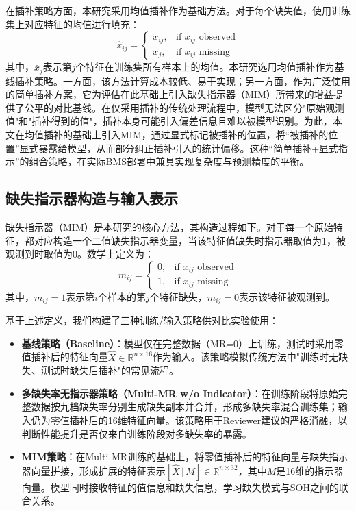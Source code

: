 \documentclass[10pt,a4paper]{ctexart}
\begin{document}
在插补策略方面，本研究采用均值插补作为基础方法。对于每个缺失值，使用训练集上对应特征的均值进行填充：
\begin{equation}
    \hat{x}_{ij} = \begin{cases}
        x_{ij}, & \text{if } x_{ij} \text{ observed} \\
        \bar{x}_j, & \text{if } x_{ij} \text{ missing}
    \end{cases}
\end{equation}
其中，$\bar{x}_j$表示第$j$个特征在训练集所有样本上的均值。本研究选用均值插补作为基线插补策略。一方面，该方法计算成本较低、易于实现；另一方面，作为广泛使用的简单插补方案，它为评估在此基础上引入缺失指示器（MIM）所带来的增益提供了公平的对比基线。在仅采用插补的传统处理流程中，模型无法区分"原始观测值"和"插补得到的值"，插补本身可能引入偏差信息且难以被模型识别。为此，本文在均值插补的基础上引入MIM，通过显式标记被插补的位置，将“被插补的位置”显式暴露给模型，从而部分纠正插补引入的统计偏移。这种“简单插补+显式指示”的组合策略，在实际BMS部署中兼具实现复杂度与预测精度的平衡。

\subsection{缺失指示器构造与输入表示}

缺失指示器（MIM）是本研究的核心方法，其构造过程如下。对于每一个原始特征，都对应构造一个二值缺失指示器变量，当该特征值缺失时指示器取值为1，被观测到时取值为0。数学上定义为：
\begin{equation}
    m_{ij} = 
    \begin{cases}
        0, & \text{if } x_{ij} \text{ observed} \\
        1, & \text{if } x_{ij} \text{ missing}
    \end{cases}
\end{equation}
其中，$m_{ij}=1$表示第$i$个样本的第$j$个特征缺失，$m_{ij}=0$表示该特征被观测到。

基于上述定义，我们构建了三种训练/输入策略供对比实验使用：

\begin{itemize}[leftmargin=2em]
    \item \textbf{基线策略（Baseline）}：模型仅在完整数据（MR=0）上训练，测试时采用零值插补后的特征向量$\hat{X} \in \mathbb{R}^{n \times 16}$作为输入。该策略模拟传统方法中"训练时无缺失、测试时缺失后插补"的常见流程。
    \item \textbf{多缺失率无指示器策略（Multi-MR w/o Indicator）}：在训练阶段将原始完整数据按九档缺失率分别生成缺失副本并合并，形成多缺失率混合训练集；输入仍为零值插补后的16维特征向量。该策略用于Reviewer建议的严格消融，以判断性能提升是否仅来自训练阶段对多缺失率的暴露。
    \item \textbf{MIM策略}：在Multi-MR训练的基础上，将零值插补后的特征向量与缺失指示器向量拼接，形成扩展的特征表示$[\hat{X} \,|\, M] \in \mathbb{R}^{n \times 32}$，其中$M$是16维的指示器向量。模型同时接收特征的值信息和缺失信息，学习缺失模式与SOH之间的联合关系。
\end{itemize}
\end{document}
